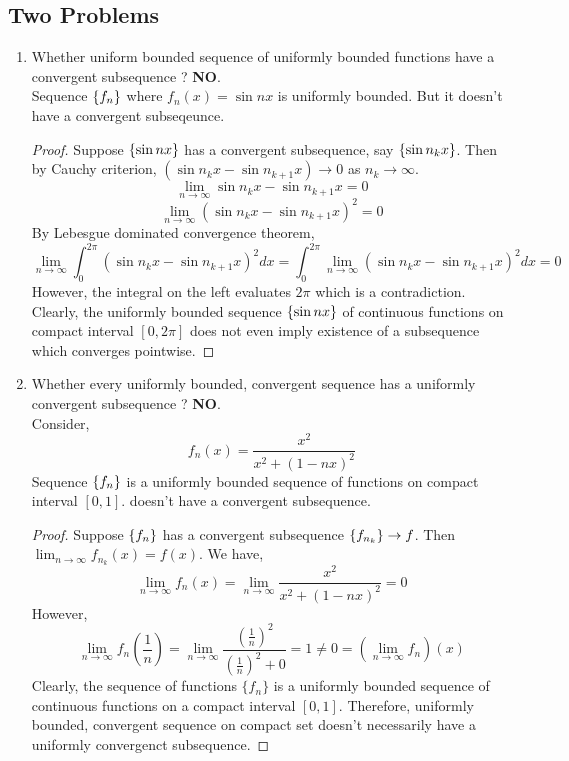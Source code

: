 \subsection{Two Problems}
\begin{enumerate}
	\item Whether uniform bounded sequence of uniformly bounded functions have a convergent subsequence ?
		\textbf{NO}.\\
		Sequence $\left\{f_n\right\}$ where $f_n(x) = \sin nx$ is uniformly bounded.
		But it doesn't have a convergent subseqeunce.
		\begin{proof}
			Suppose $\left\{\sin nx\right\}$ has a convergent subsequence, say $\left\{\sin n_kx\right\}$.
			Then by Cauchy criterion, $(\sin n_k x - \sin n_{k+1}x) \to 0$ as $n_k \to \infty$.
			\[ \lim_{n \to \infty} \sin n_k x - \sin n_{k+1}x = 0 \]
			\[ \lim_{n \to \infty} (\sin n_k x - \sin n_{k+1}x)^2 = 0 \]
			By Lebesgue dominated convergence theorem,
			\[ \lim_{n \to \infty} \int_0^{2\pi} (\sin n_kx - \sin n_{k+1}x)^2 dx = \int_0^{2\pi} \lim_{n \to \infty} (\sin n_kx - \sin n_{k+1}x)^2 dx = 0 \]
			However, the integral on the left evaluates $2\pi$ which is a contradiction.
			Clearly, the uniformly bounded sequence $\left\{\sin nx\right\}$ of continuous functions on compact interval $[0,2\pi]$ does not even imply existence of a subsequence which converges pointwise.
		\end{proof}
	\item Whether every uniformly bounded, convergent sequence has a  uniformly convergent subsequence ?
		\textbf{NO}.\\
		Consider,
		\[ f_n(x) = \frac{x^2}{x^2+(1-nx)^2} \]
		Sequence $\left\{f_n\right\}$ is a uniformly bounded sequence of functions on compact interval $[0,1]$.
		doesn't have a convergent subsequence.
		\begin{proof}
			Suppose $\left\{f_n\right\}$ has a convergent subsequence $\left\{f_{n_k}\right\} \to f$.
			Then $\displaystyle \lim_{n \to \infty} f_{n_k}(x) = f(x)$.
			We have,
			\[ \lim_{n \to \infty} f_n(x) = \lim_{n \to \infty} \frac{x^2}{x^2+(1-nx)^2} = 0 \]
			However,
			\[ \lim_{n \to \infty} f_n \left(\frac{1}{n}\right) = \lim_{n \to \infty} \frac{\left(\frac{1}{n}\right)^2}{\left(\frac{1}{n}\right)^2+0} = 1 \ne 0 = \left(\lim_{n \to \infty} f_n\right)(x) \] 
			Clearly, the sequence of functions $\{ f_n\}$ is a uniformly bounded sequence of continuous functions on a compact interval $[0,1]$.
			Therefore, uniformly bounded, convergent sequence on compact set doesn't necessarily have a uniformly convergenct subsequence.
		\end{proof}
\end{enumerate}


